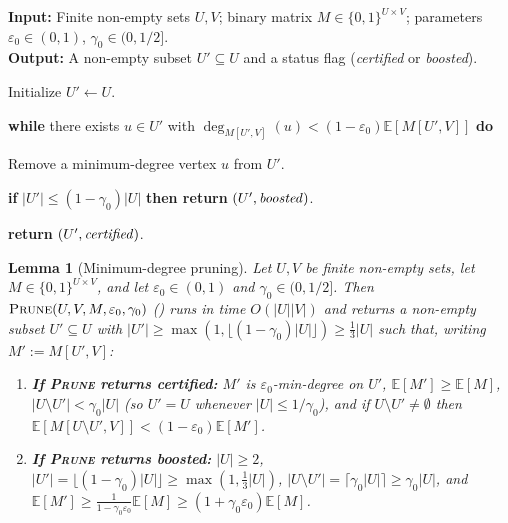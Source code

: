 \documentclass[11pt]{article}
\newtheorem{lemma}[theorem]{Lemma}
\theoremstyle{definition}
\renewcommand{\label}[1]{}%
\newcommand{\E}{\mathbb{E}}
\newcommand{\abs}[1]{\left\lvert #1 \right\rvert}
\newcommand{\dens}[1]{\E[#1]}
\newcommand{\Prune}{\textnormal{\textsc{Prune}}}
\begin{document}
\begin{algorithm}[t]
\caption{$\Prune(U, V, M, \varepsilon_0, \gamma_0)$}\label{alg:prune}
\textbf{Input:} Finite non-empty sets $U, V$; binary matrix $M \in \{0, 1\}^{U \times V}$; parameters $\varepsilon_0 \in (0, 1)$, $\gamma_0 \in (0, 1/2]$.\\
\textbf{Output:} A non-empty subset $U' \subseteq U$ and a status flag (\emph{certified} or \emph{boosted}).
\begin{algsteps}
    \item Initialize $U' \gets U$.\label{line:prune-init}
    \item \textbf{while} there exists $u \in U'$ with $\deg_{M[U', V]}(u) < (1 - \varepsilon_0)\dens{M[U', V]}$ \textbf{do}\label{line:prune-while}
    \item \quad Remove a minimum-degree vertex $u$ from $U'$.\label{line:prune-remove}
    \item \quad \textbf{if} $\abs{U'} \le (1 - \gamma_0)\abs{U}$ \textbf{then return} $(U', \text{\emph{boosted}})$.\label{line:prune-boost}
    \item \textbf{return} $(U', \text{\emph{certified}})$.\label{line:prune-cert}
\end{algsteps}
\end{algorithm}

\begin{lemma}[Minimum-degree pruning]
\label{lem:min-degree}
Let $U, V$ be finite non-empty sets, let $M \in \{0, 1\}^{U \times V}$, and let $\varepsilon_0 \in (0, 1)$ and $\gamma_0 \in (0, 1/2]$. Then $\Prune(U, V, M, \varepsilon_0, \gamma_0)$ () runs in time $O(\abs{U}\abs{V})$ and returns a non-empty subset $U' \subseteq U$ with $\abs{U'} \ge \max(1, \lfloor (1 - \gamma_0)\abs{U} \rfloor) \ge \frac{1}{3}\abs{U}$ such that, writing $M' := M[U', V]$:
\begin{enumerate}[leftmargin=*]
    \item \textbf{If \Prune{} returns \emph{certified}:} $M'$ is $\varepsilon_0$-min-degree on $U'$, $\dens{M'} \ge \dens{M}$, $\abs{U \setminus U'} < \gamma_0\abs{U}$ (so $U' = U$ whenever $\abs{U} \le 1/\gamma_0$), and if $U \setminus U' \ne \emptyset$ then $\dens{M[U \setminus U', V]} < (1 - \varepsilon_0)\dens{M'}$.
    \item \textbf{If \Prune{} returns \emph{boosted}:} $\abs{U} \ge 2$, $\abs{U'} = \lfloor (1 - \gamma_0)\abs{U} \rfloor \ge \max(1, \frac{1}{3}\abs{U})$, $\abs{U \setminus U'} = \lceil \gamma_0\abs{U} \rceil \ge \gamma_0\abs{U}$, and $\dens{M'} \ge \frac{1}{1 - \gamma_0\varepsilon_0}\dens{M} \ge (1 + \gamma_0\varepsilon_0)\dens{M}$.
\end{enumerate}
\end{lemma}
\end{document}
